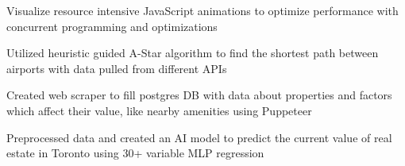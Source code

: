\documentclass[letterpaper]{deedy-resume} %
\begin{document}
\begin{minipage}[t]{0.66\textwidth}
\begin{tightitemize}
\end{tightitemize}

\sectionspace

\begin{tightitemize}

\item Visualize resource intensive JavaScript animations to optimize performance with concurrent programming and optimizations

\item Utilized heuristic guided A-Star algorithm to find the shortest path between airports with data pulled from different APIs

\end{tightitemize}

\sectionspace

\begin{tightitemize}

\item Created web scraper to fill postgres DB with data about properties and factors which affect their value, like nearby amenities using Puppeteer
\item Preprocessed data and created an AI model to predict the current value of real estate in Toronto using 30+ variable MLP regression

\end{tightitemize}






\end{minipage}
\end{document}
